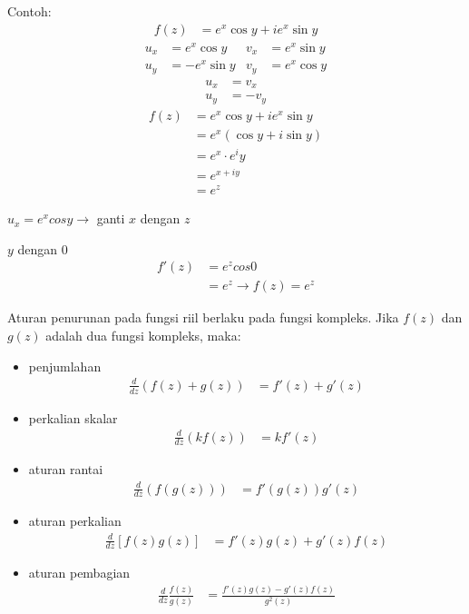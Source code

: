 \documentclass{article}
\begin{document}
    Contoh:
    \begin{align}
        f(z)    &= e^x \cos y + i e^x \sin y
                \nonumber
    \end{align}
    \begin{align}
        u_x     &= e^x \cos y       &v_x &= e^x \sin y
                \nonumber\\  
        u_y     &= -e^x \sin y      &v_y &= e^x \cos y
                \nonumber
    \end{align}
    \begin{align}
        u_x     &= v_x
                \nonumber\\ 
        u_y     &= -v_y
                \nonumber
    \end{align}
    \begin{align}
        f(z)    &= e^x \cos y + i e^x \sin y
                \nonumber\\ 
                &= e^x (\cos y + i \sin y)
                \nonumber\\ 
                &= e^x \cdot e^iy
                \nonumber\\ 
                &= e^{x+iy}
                \nonumber\\ 
                &= e^z
                \nonumber\
    \end{align}

    $u_x  = e^x cos y \rightarrow$ ganti $x$ dengan $z$

    $y$ dengan $0$
    \begin{align}        
        f'(z)   &= e^z cos 0
                \nonumber\\
                &= e^z \rightarrow f(z) = e^z
                \nonumber
    \end{align}


    \newpage
    Aturan penurunan pada fungsi riil berlaku pada fungsi kompleks. Jika $f(z)$ dan $g(z)$ adalah dua fungsi kompleks, maka:
    \begin{itemize}
        \item penjumlahan
        \begin{align}
            \frac{d}{dz}(f(z)+g(z)) &= f'(z) + g'(z)
        \end{align}
        \item perkalian skalar
        \begin{align}
            \frac{d}{dz}(kf(z)) &= kf'(z)
        \end{align}
        \item aturan rantai
        \begin{align}
            \frac{d}{dz}(f(g(z))) &= f'(g(z)) g'(z)
        \end{align}
        \item aturan perkalian
        \begin{align}
            \frac{d}{dz}[f(z)g(z)] &= f'(z)g(z) + g'(z)f(z)
        \end{align}
        \item aturan pembagian
        \begin{align}
            \frac{d}{dz}\frac{f(z)}{g(z)} &= \frac{f'(z)g(z) - g'(z)f(z)}{g^2(z)}
        \end{align}
    \end{itemize}
\end{document}
